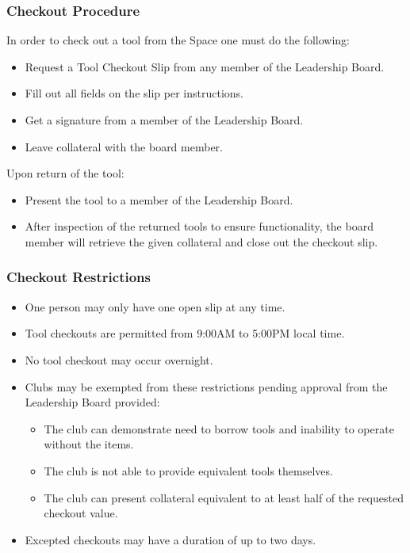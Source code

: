 \documentclass[12pt,letterpaper]{article}
\begin{document}
\subsubsection{Checkout Procedure}
In order to check out a tool from the Space one must do the following: 
\begin{itemize}
    \item Request a Tool Checkout Slip from any member of the Leadership Board.
    \item Fill out all fields on the slip per instructions.
    \item Get a signature from a member of the Leadership Board.
    \item Leave collateral with the board member.
\end{itemize}
Upon return of the tool:
\begin{itemize}
    \item Present the tool to a member of the Leadership Board.
    \item After inspection of the returned tools to ensure functionality,
    the board member will retrieve the given collateral and close out the checkout slip.
\end{itemize}
\subsubsection{Checkout Restrictions}
\begin{itemize}
    \item One person may only have one open slip at any time.
    \item Tool checkouts are permitted from 9:00AM to 5:00PM local time.
    \item No tool checkout may occur overnight.
    \item Clubs may be exempted from these restrictions pending approval from the Leadership Board provided:
    \begin{itemize}
        \item The club can demonstrate need to borrow tools and inability to operate without the items.
        \item The club is not able to provide equivalent tools themselves.
        \item The club can present collateral equivalent to at least half of the requested checkout value.
    \end{itemize}
    \item Excepted checkouts may have a duration of up to two days.
\end{itemize}
\end{document}

